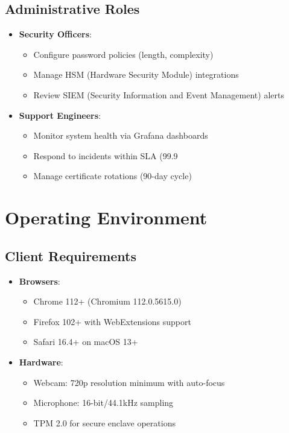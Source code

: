 \documentclass{scrreprt}
\begin{document}
\subsection{Administrative Roles}
\begin{itemize}
    \item \textbf{Security Officers}:
    \begin{itemize}
        \item Configure password policies (length, complexity)
        \item Manage HSM (Hardware Security Module) integrations
        \item Review SIEM (Security Information and Event Management) alerts
    \end{itemize}
    
    \item \textbf{Support Engineers}:
    \begin{itemize}
        \item Monitor system health via Grafana dashboards
        \item Respond to incidents within SLA (99.9%
        \item Manage certificate rotations (90-day cycle)
    \end{itemize}
\end{itemize}

\section{Operating Environment}
\label{sec:operating-environment}

\subsection{Client Requirements}
\begin{itemize}
    \item \textbf{Browsers}:
    \begin{itemize}
        \item Chrome 112+ (Chromium 112.0.5615.0)
        \item Firefox 102+ with WebExtensions support
        \item Safari 16.4+ on macOS 13+
    \end{itemize}
    
    \item \textbf{Hardware}:
    \begin{itemize}
        \item Webcam: 720p resolution minimum with auto-focus
        \item Microphone: 16-bit/44.1kHz sampling
        \item TPM 2.0 for secure enclave operations
    \end{itemize}
\end{itemize}
\end{document}
